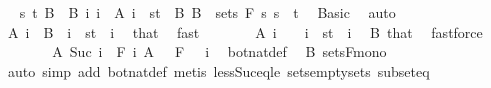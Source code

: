 \begin{isabellebody}
\ \isamarkupfalse%
\ s\ t\ B\ \ B{\isacharcolon}{\kern0pt}\ {\isachardoublequoteopen}{\isacharparenleft}{\kern0pt}{\isasymUnion}i{\isachardot}{\kern0pt}\ {\isacharbraceleft}{\kern0pt}i{\isacharbraceright}{\kern0pt}\ {\isasymtimes}\ A\ i{\isacharparenright}{\kern0pt}\ {\isacharequal}{\kern0pt}\ {\isacharbraceleft}{\kern0pt}s{\isacharless}{\kern0pt}{\isachardot}{\kern0pt}{\isachardot}{\kern0pt}t{\isacharbraceright}{\kern0pt}\ {\isasymtimes}\ B{\isachardoublequoteclose}\ {\isachardoublequoteopen}B\ {\isasymin}\ sets\ {\isacharparenleft}{\kern0pt}F\ s{\isacharparenright}{\kern0pt}{\isachardoublequoteclose}\ {\isachardoublequoteopen}s\ {\isacharless}{\kern0pt}\ t{\isachardoublequoteclose}\ \isamarkupfalse%
\ Basic\ \isamarkupfalse%
\ auto\isanewline
\ \ \ \ \isamarkupfalse%
\ {\isachardoublequoteopen}A\ i\ {\isacharequal}{\kern0pt}\ B{\isachardoublequoteclose}\ \ {\isachardoublequoteopen}i\ {\isasymin}\ {\isacharbraceleft}{\kern0pt}s{\isacharless}{\kern0pt}{\isachardot}{\kern0pt}{\isachardot}{\kern0pt}t{\isacharbraceright}{\kern0pt}{\isachardoublequoteclose}\ \ i\ \isamarkupfalse%
\ that\ \isamarkupfalse%
\ fast\isanewline
\ \ \ \ \isamarkupfalse%
\ \isamarkupfalse%
\ {\isachardoublequoteopen}A\ i\ {\isacharequal}{\kern0pt}\ {\isacharbraceleft}{\kern0pt}{\isacharbraceright}{\kern0pt}{\isachardoublequoteclose}\ \ {\isachardoublequoteopen}i\ {\isasymnotin}\ {\isacharbraceleft}{\kern0pt}s{\isacharless}{\kern0pt}{\isachardot}{\kern0pt}{\isachardot}{\kern0pt}t{\isacharbraceright}{\kern0pt}{\isachardoublequoteclose}\ \ i\ \isamarkupfalse%
\ B\ that\ \isamarkupfalse%
\ fastforce\isanewline
\ \ \ \ \isamarkupfalse%
\ \isamarkupfalse%
\ {\isachardoublequoteopen}A\ {\isacharparenleft}{\kern0pt}Suc\ i{\isacharparenright}{\kern0pt}\ {\isasymin}\ F\ i{\isachardoublequoteclose}\ {\isachardoublequoteopen}A\ {}\ {\isasymin}\ F\ {}{\isachardoublequoteclose}\ \ i\ \isamarkupfalse%
\ bot{\isacharunderscore}{\kern0pt}nat{\isacharunderscore}{\kern0pt}def\ \isamarkupfalse%
\ B\ sets{\isacharunderscore}{\kern0pt}F{\isacharunderscore}{\kern0pt}mono\ \isamarkupfalse%
\ {\isacharparenleft}{\kern0pt}auto\ simp\ add{\isacharcolon}{\kern0pt}\ bot{\isacharunderscore}{\kern0pt}nat{\isacharunderscore}{\kern0pt}def{\isacharparenright}{\kern0pt}\ {\isacharparenleft}{\kern0pt}metis\ less{\isacharunderscore}{\kern0pt}Suc{\isacharunderscore}{\kern0pt}eq{\isacharunderscore}{\kern0pt}le\ sets{\isachardot}{\kern0pt}empty{\isacharunderscore}{\kern0pt}sets\ subset{\isacharunderscore}{\kern0pt}eq{\isacharparenright}{\kern0pt}\isanewline

\end{isabellebody}
